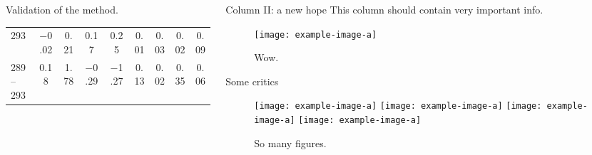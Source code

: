 \begin{frame}[t]
\begin{columns}[t]
\begin{column}{\colwidth}
\begin{block}{Validation of the method.}
\begin{table}
\begin{center}
\begin{tabular}{@{} l c c c c c c c c @{}}
                     293  & \num{-0.02}         &\num{0.21}        & \num{ 0.17} &  \num{0.25} & \num{0.01} & \num{0.03}         & \num{0.02}& \num{0.09}                   \\
                     289--293& \num{ 0.18}         &\num{1.78}  & \num{-0.29} &  \num{-1.27} & \alert{\num{0.13}} & \alert{\num{0.02}}         & \alert{\num{0.35}}& \alert{\num{0.06}}                   \\
                     \bottomrule
                  \end{tabular}
               \end{center}
            \end{table}
         \end{block}

      \end{column}
      \separatorcolumn
      \begin{column}{\colwidth}
         \begin{block}{Column II: a new hope}
            This column should contain \alert{very important} info.
            \begin{figure}
               \centering
               \texttt{[image: example-image-a]}
               \caption{%
                  Wow.
               }
            \end{figure}
         \end{block}

         \begin{block}{Some critics}
            \begin{figure}
               \centering
               \texttt{[image: example-image-a]}
               \texttt{[image: example-image-a]}
               \texttt{[image: example-image-a]}
               \texttt{[image: example-image-a]}
               \caption{%
                  So many figures.
               }
            \end{figure}


\end{block}
\end{column}
\end{columns}
\end{frame}
